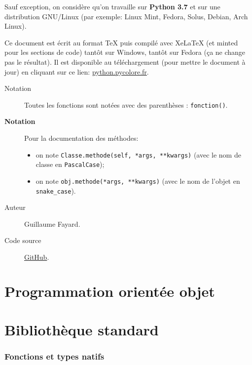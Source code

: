 \documentclass[a4paper, 10pt]{article}
\begin{document}
Sauf exception, on considère qu'on travaille sur \textbf{Python 3.7} et sur une distribution GNU/Linux (par exemple: Linux Mint, Fedora, Solus, Debian, Arch Linux).\medskip

Ce document est écrit au format TeX puis compilé avec XeLaTeX (et minted pour les sections de code) tantôt sur Windows, tantôt sur Fedora (ça ne change pas le résultat). Il est disponible au téléchargement (pour mettre le document à jour) en cliquant sur ce lien: \href{http://python.pycolore.fr}{python.pycolore.fr}.\medskip

\begin{description}
    \item[{\sffamily Notation}] Toutes les fonctions sont notées avec des parenthèses : \texttt{fonction()}.	\item[{\bfseries\sffamily Notation}] Pour la documentation des méthodes:
        \begin{itemize}
            \item on note \texttt{Classe.methode(self, *args, **kwargs)} (avec le nom de classe en \texttt{PascalCase});
            \item on note \texttt{obj.methode(*args, **kwargs)} (avec le nom de l'objet en \texttt{snake_case}).
        \end{itemize} 
    \item[{\sffamily Auteur}] Guillaume Fayard.
    \item[{\sffamily Code source}] \href{https://github.com/Arkelis/memo-python}{GitHub}.
\end{description}

\newpage
\part{Programmation orientée objet}











\newpage

\part{Bibliothèque standard}

\section{Fonctions et types natifs}
\end{document}
